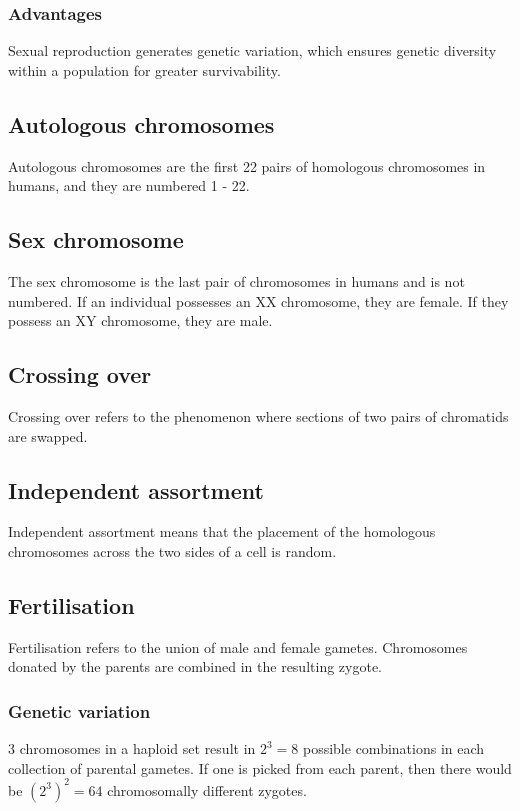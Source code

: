 \documentclass[11pt]{article}
\begin{document}
\subsubsection{Advantages}
\label{sec:orgd777114}
Sexual reproduction generates genetic variation, which ensures genetic diversity within a population for greater survivability.

\subsection{Autologous chromosomes}
\label{sec:org61e98b6}
Autologous chromosomes are the first 22 pairs of homologous chromosomes in humans, and they are numbered 1 - 22.

\subsection{Sex chromosome}
\label{sec:orgf7baca9}
The sex chromosome is the last pair of chromosomes in humans and is not numbered. If an individual possesses an XX chromosome, they are female. If they possess an XY chromosome, they are male.

\subsection{Crossing over}
\label{sec:orgd2d80e6}
Crossing over refers to the phenomenon where sections of two pairs of chromatids are swapped.

\subsection{Independent assortment}
\label{sec:org3670990}
Independent assortment means that the placement of the homologous chromosomes across the two sides of a cell is random.

\subsection{Fertilisation}
\label{sec:org11d3c5b}
Fertilisation refers to the union of male and female gametes. Chromosomes donated by the parents are combined in the resulting zygote.

\subsubsection{Genetic variation}
\label{sec:org9ee9411}
3 chromosomes in a haploid set result in \(2^3 = 8\) possible combinations in each collection of parental gametes. If one is picked from each parent, then there would be \((2^3)^2 = 64\) chromosomally different zygotes.
\\[0pt]
\end{document}
